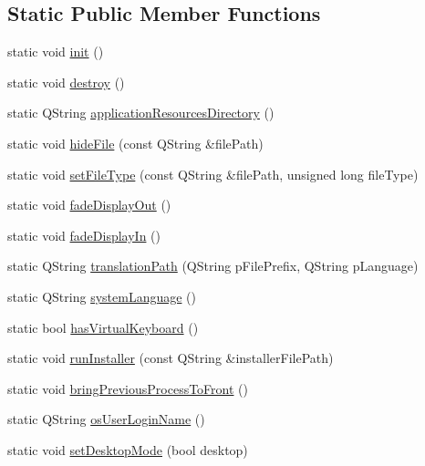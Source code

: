 \subsection*{Static Public Member Functions}
\begin{DoxyCompactItemize}
\item 
static void \hyperlink{class_u_b_platform_utils_a2ddb91cb25f3a1048a683d5eefda666a}{init} ()
\item 
static void \hyperlink{class_u_b_platform_utils_aa5c4a0695d9b154662b383003d659426}{destroy} ()
\item 
static Q\-String \hyperlink{class_u_b_platform_utils_ae595b29e794b20564550fd45515fc0a8}{application\-Resources\-Directory} ()
\item 
static void \hyperlink{class_u_b_platform_utils_a8377be08a4f66cb36e0f15d5108c21b0}{hide\-File} (const Q\-String \&file\-Path)
\item 
static void \hyperlink{class_u_b_platform_utils_a04e6a4828959fe85be224f65c61be0dd}{set\-File\-Type} (const Q\-String \&file\-Path, unsigned long file\-Type)
\item 
static void \hyperlink{class_u_b_platform_utils_a68a5c07988899d87cfbb9e9e1daca556}{fade\-Display\-Out} ()
\item 
static void \hyperlink{class_u_b_platform_utils_a8d5f0c37f7f7e9d0c8dd4b6592d9dddb}{fade\-Display\-In} ()
\item 
static Q\-String \hyperlink{class_u_b_platform_utils_a0963ca928fc4ce89cc20850af16d6337}{translation\-Path} (Q\-String p\-File\-Prefix, Q\-String p\-Language)
\item 
static Q\-String \hyperlink{class_u_b_platform_utils_a160873cff39be9402ffeb0aa978e101c}{system\-Language} ()
\item 
static bool \hyperlink{class_u_b_platform_utils_a315df832d127b0b3491e9088643bd74e}{has\-Virtual\-Keyboard} ()
\item 
static void \hyperlink{class_u_b_platform_utils_a35b9fc9b855f4f992599393b67d8f131}{run\-Installer} (const Q\-String \&installer\-File\-Path)
\item 
static void \hyperlink{class_u_b_platform_utils_a658405f4d6aba0405efdbfd6c0c219f4}{bring\-Previous\-Process\-To\-Front} ()
\item 
static Q\-String \hyperlink{class_u_b_platform_utils_a4ff6063df12b6d4d0c60c1a17b434599}{os\-User\-Login\-Name} ()
\item 
static void \hyperlink{class_u_b_platform_utils_a8109e9ed9d624def6b73a88706adf215}{set\-Desktop\-Mode} (bool desktop)

\end{DoxyCompactItemize}
